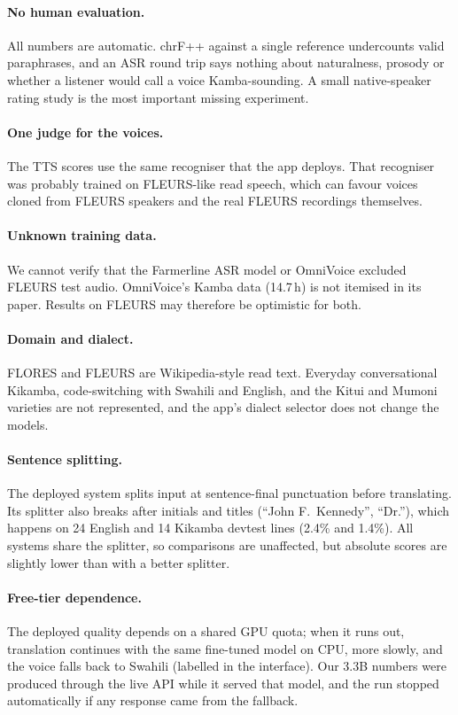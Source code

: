 \documentclass[11pt]{article}
\begin{document}
\paragraph{No human evaluation.} All numbers are automatic. chrF++ against a single reference undercounts valid paraphrases, and an ASR round trip says nothing about naturalness, prosody or whether a listener would call a voice Kamba-sounding. A small native-speaker rating study is the most important missing experiment.

\paragraph{One judge for the voices.} The TTS scores use the same recogniser that the app deploys. That recogniser was probably trained on FLEURS-like read speech, which can favour voices cloned from FLEURS speakers and the real FLEURS recordings themselves.

\paragraph{Unknown training data.} We cannot verify that the Farmerline ASR model or OmniVoice excluded FLEURS test audio. OmniVoice's Kamba data (14.7\,h) is not itemised in its paper. Results on FLEURS may therefore be optimistic for both.

\paragraph{Domain and dialect.} FLORES and FLEURS are Wikipedia-style read text. Everyday conversational Kikamba, code-switching with Swahili and English, and the Kitui and Mumoni varieties are not represented, and the app's dialect selector does not change the models.

\paragraph{Sentence splitting.} The deployed system splits input at sentence-final punctuation before translating. Its splitter also breaks after initials and titles (``John F.\ Kennedy'', ``Dr.''), which happens on 24 English and 14 Kikamba devtest lines (2.4\% and 1.4\%). All systems share the splitter, so comparisons are unaffected, but absolute scores are slightly lower than with a better splitter.

\paragraph{Free-tier dependence.} The deployed quality depends on a shared GPU quota; when it runs out, translation continues with the same fine-tuned model on CPU, more slowly, and the voice falls back to Swahili (labelled in the interface). Our 3.3B numbers were produced through the live API while it served that model, and the run stopped automatically if any response came from the fallback.
\end{document}
